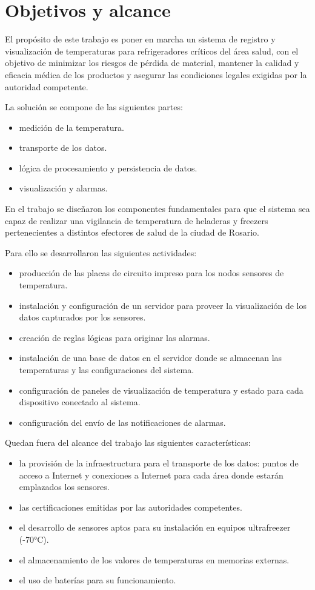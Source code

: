 \section{Objetivos y alcance}
\label{objetivos}
El propósito de este trabajo es poner en marcha un sistema de registro y visualización de temperaturas para refrigeradores críticos del área salud, con el objetivo de minimizar los riesgos de pérdida de material, mantener la calidad y eficacia médica de los productos y asegurar las condiciones legales exigidas por la autoridad competente.

La solución se compone de las siguientes partes:
\begin{itemize}
\item medición de la temperatura.
\item transporte de los datos.
\item lógica de procesamiento y persistencia de datos.
\item visualización y alarmas.
\end{itemize}


En el trabajo se diseñaron los componentes fundamentales para que el sistema sea capaz de realizar una vigilancia de temperatura de heladeras y freezers pertenecientes a distintos efectores de salud de la ciudad de Rosario. 

Para ello se desarrollaron las siguientes actividades:

\begin{itemize}
\item producción de las placas de circuito impreso para los nodos sensores de temperatura.
\item instalación y configuración de un servidor para proveer la visualización de los datos capturados por los sensores.
\item creación de reglas lógicas para originar las alarmas.
\item instalación de una base de datos en el servidor donde se almacenan las temperaturas y las configuraciones del sistema.
\item configuración de paneles de visualización de temperatura y estado para cada dispositivo conectado al sistema.
\item configuración del envío de las notificaciones de alarmas.
\end{itemize}

Quedan fuera del alcance del trabajo las siguientes características:
\begin{itemize}
\item la provisión de la infraestructura para el transporte de los datos: puntos de acceso a Internet y conexiones a Internet para cada área donde estarán emplazados los sensores.
\item las certificaciones emitidas por las autoridades competentes.
\item el desarrollo de sensores aptos para su instalación en equipos ultrafreezer (-70°C).
\item el almacenamiento de los valores de temperaturas en memorias externas.
\item el uso de baterías para su funcionamiento.
\end{itemize}




